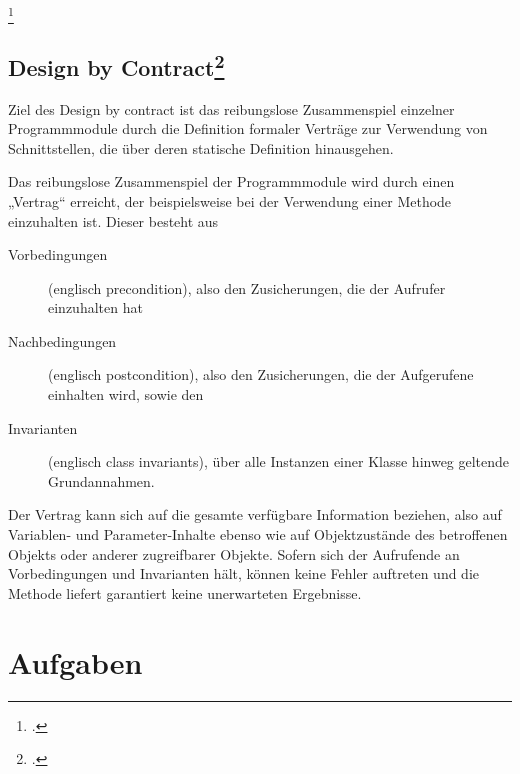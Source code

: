 \documentclass{lehramt-informatik}
\begin{document}
\footcite[Seite 44]{sosy:fs:5}

%

\section{Design by Contract\footcite{wiki:design-by-contract}}

Ziel des Design by contract ist das reibungslose Zusammenspiel einzelner
Programmmodule durch die Definition formaler Verträge zur Verwendung von
Schnittstellen, die über deren statische Definition hinausgehen.

Das reibungslose Zusammenspiel der Programmmodule wird durch einen
„Vertrag“ erreicht, der beispielsweise bei der Verwendung einer Methode
einzuhalten ist. Dieser besteht aus

\begin{description}
\item[Vorbedingungen] (englisch precondition), also den Zusicherungen,
die der Aufrufer einzuhalten hat

\item[Nachbedingungen] (englisch postcondition), also den Zusicherungen,
die der Aufgerufene einhalten wird, sowie den

\item[Invarianten] (englisch class invariants), über alle Instanzen
einer Klasse hinweg geltende Grundannahmen.
\end{description}

Der Vertrag kann sich auf die gesamte verfügbare Information beziehen,
also auf Variablen- und Parameter-Inhalte ebenso wie auf Objektzustände
des betroffenen Objekts oder anderer zugreifbarer Objekte. Sofern sich
der Aufrufende an Vorbedingungen und Invarianten hält, können keine
Fehler auftreten und die Methode liefert garantiert keine unerwarteten
Ergebnisse.


\chapter{Aufgaben}

%
\end{document}
